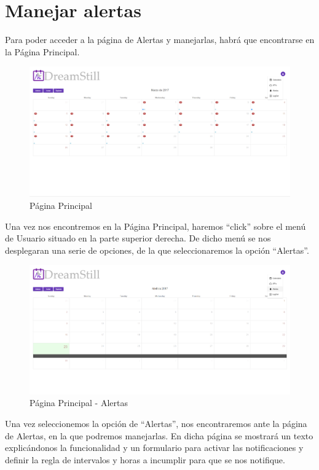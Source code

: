 \documentclass[11pt,openany]{book}
\begin{document}
\section{Manejar alertas}

Para poder acceder a la página de Alertas y manejarlas, habrá que encontrarse en la Página Principal.

\begin{figure}[H]
\centering
\includegraphics[totalheight=6cm]{manualUsuario/paginaPrincipal.png}
\caption{Página Principal}
\end{figure}

Una vez nos encontremos en la Página Principal, haremos ``click'' sobre el menú de Usuario situado en la parte superior derecha. De dicho menú se nos desplegaran una serie de opciones, de la que seleccionaremos la opción ``Alertas''.

\begin{figure}[H]
\centering
\includegraphics[totalheight=6cm]{manualUsuario/alertas.png}
\caption{Página Principal - Alertas}
\end{figure}

Una vez seleccionemos la opción de ``Alertas'', nos encontraremos ante la página de Alertas, en la que podremos manejarlas. En dicha página se mostrará un texto explicándonos la funcionalidad y un formulario para activar las notificaciones y definir la regla de intervalos y horas a incumplir para que se nos notifique.
\end{document}
